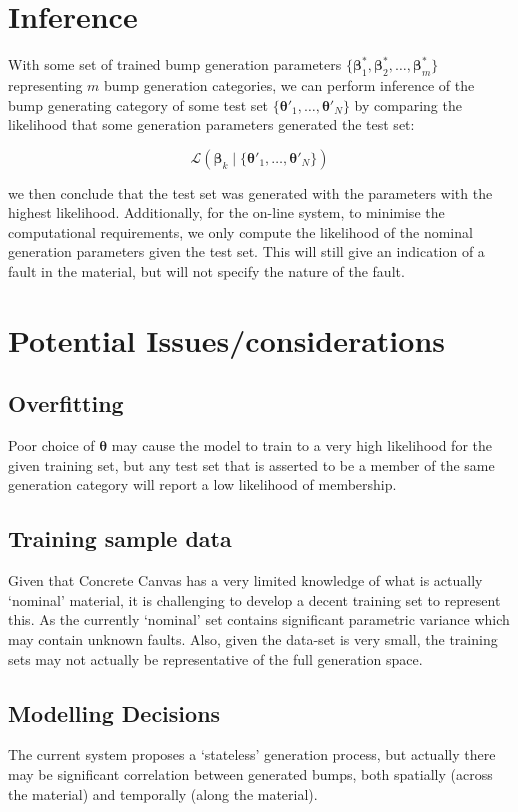 \documentclass[12pt]{report}
\begin{document}
    \section{Inference}
        With some set of trained bump generation parameters $\{\pmb{\beta}^*_1,\pmb{\beta}^*_2,\ldots,\pmb{\beta}^*_m\}$ representing $m$ bump generation categories, we can perform inference of the bump generating category of some test set $\{\pmb{\theta}'_1,\ldots,\pmb{\theta}'_N\}$ by comparing the likelihood that some generation parameters generated the test set:
        
        \[ 
            \mathcal{L}(\pmb{\beta}_k \mid \{\pmb{\theta}'_1,\ldots,\pmb{\theta}'_N\})
        \]
        
        we then conclude that the test set was generated with the parameters with the highest likelihood. Additionally, for the on-line system, to minimise the computational requirements, we only compute the likelihood of the nominal generation parameters given the test set. This will still give an indication of a fault in the material, but will not specify the nature of the fault.
        
    \section{Potential Issues/considerations}
        \subsection{Overfitting}
            Poor choice of $\pmb{\theta}$ may cause the model to train to a very high likelihood for the given training set, but any test set that is asserted to be a member of the same generation category will report a low likelihood of membership. 
        \subsection{Training sample data}
            Given that Concrete Canvas has a very limited knowledge of what is actually `nominal' material, it is challenging to develop a decent training set to represent this. As the currently `nominal' set contains significant parametric variance which may contain unknown faults.
            Also, given the data-set is very small, the training sets may not actually be representative of the full generation space.
        \subsection{Modelling Decisions}
            The current system proposes a `stateless' generation process, but actually there may be significant correlation between generated bumps, both spatially (across the material) and temporally (along the material). 
\end{document}
